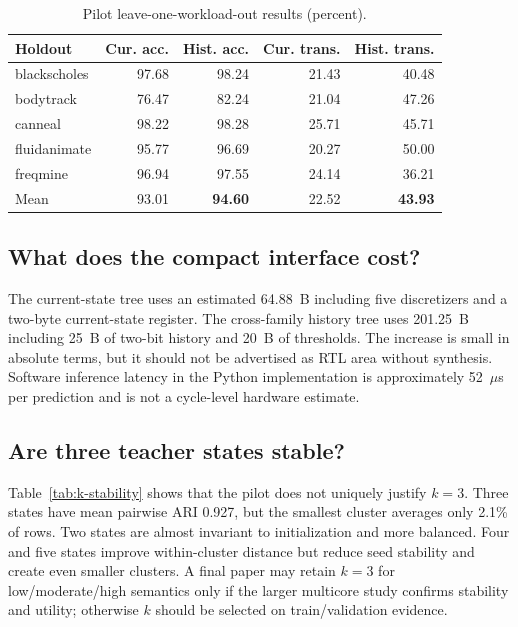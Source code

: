 \documentclass[conference,10pt]{IEEEtran}
\begin{document}
\begin{table}[t]
\centering
\caption{Pilot leave-one-workload-out results (percent).}
\label{tab:pilot-loo}
\scriptsize
\setlength{\tabcolsep}{3pt}
\begin{tabular}{lrrrr}
\toprule
Holdout & Cur. acc. & Hist. acc. & Cur. trans. & Hist. trans. \\
\midrule
blackscholes & 97.68 & 98.24 & 21.43 & 40.48 \\
bodytrack & 76.47 & 82.24 & 21.04 & 47.26 \\
canneal & 98.22 & 98.28 & 25.71 & 45.71 \\
fluidanimate & 95.77 & 96.69 & 20.27 & 50.00 \\
freqmine & 96.94 & 97.55 & 24.14 & 36.21 \\
\midrule
Mean & 93.01 & \textbf{94.60} & 22.52 & \textbf{43.93} \\
\bottomrule
\end{tabular}
\end{table}

\subsection{What does the compact interface cost?}

The current-state tree uses an estimated 64.88~B including five discretizers and a
two-byte current-state register. The cross-family history tree uses 201.25~B including
25~B of two-bit history and 20~B of thresholds. The increase is small in absolute terms,
but it should not be advertised as RTL area without synthesis. Software inference
latency in the Python implementation is approximately 52~$\mu$s per prediction and is
not a cycle-level hardware estimate.

\subsection{Are three teacher states stable?}

Table~\ref{tab:k-stability} shows that the pilot does not uniquely justify $k=3$.
Three states have mean pairwise ARI 0.927, but the smallest cluster averages only 2.1\%
of rows. Two states are almost invariant to initialization and more balanced. Four and
five states improve within-cluster distance but reduce seed stability and create even
smaller clusters. A final paper may retain $k=3$ for low/moderate/high semantics only
if the larger multicore study confirms stability and utility; otherwise $k$ should be
selected on train/validation evidence.
\end{document}
